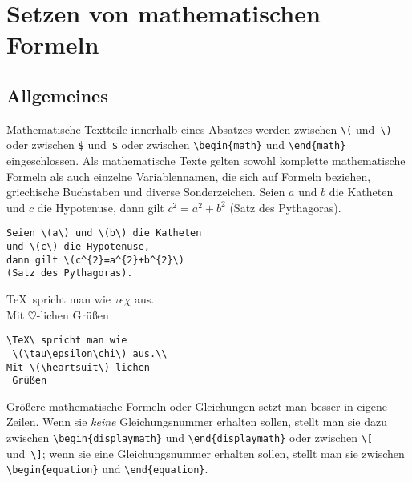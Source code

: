 

\section{Setzen von mathematischen Formeln} \label{math}
 
\subsection{Allgemeines}
 
Mathematische Textteile innerhalb eines Absatzes werden zwischen
\lstinline|\(| und~\lstinline|\)| oder zwischen \lstinline|$| und~\lstinline|$| oder
zwischen \lstinline|\begin{math}| und \lstinline|\end{math}|
eingeschlossen.
Als mathematische Texte gelten sowohl komplette mathematische
Formeln als auch einzelne Variablennamen, die sich auf Formeln
beziehen, griechische Buchstaben und diverse Sonderzeichen.
\exa
Seien \(a\) und \(b\) die Katheten
und \(c\) die Hypotenuse,
dann gilt \(c^{2}=a^{2}+b^{2}\)
(Satz des Pythagoras).
\exb
\begin{verbatim}
Seien \(a\) und \(b\) die Katheten
und \(c\) die Hypotenuse,
dann gilt \(c^{2}=a^{2}+b^{2}\)
(Satz des Pythagoras).
\end{verbatim}
\exc
\exa
\TeX\ spricht man wie
 \(\tau\epsilon\chi\) aus.\\[6pt]
Mit \(\heartsuit\)-lichen
 Grüßen
\exb
\begin{verbatim}
\TeX\ spricht man wie
 \(\tau\epsilon\chi\) aus.\\
Mit \(\heartsuit\)-lichen
 Grüßen
\end{verbatim}
\exc
 
Größere mathematische Formeln oder Gleichungen setzt man besser
in eigene Zeilen. Wenn sie \emph{keine} Gleichungsnummer erhalten 
sollen, stellt man sie dazu zwischen \lstinline|\begin{displaymath}| und
\lstinline|\end{displaymath}| oder zwischen \lstinline|\[| und~\lstinline|\]|; 
wenn sie eine Gleichungsnummer erhalten sollen, stellt man sie
zwischen \lstinline|\begin{equation}| und \lstinline|\end{equation}|.

